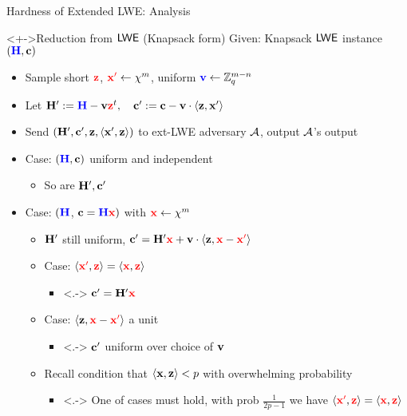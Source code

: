 \begin{frame}{Hardness of Extended LWE: Analysis}
\begin{block}<+->{Reduction from $\textsf{LWE}$ (Knapsack form)}
   Given: Knapsack $\textsf{LWE}$ instance  {\centering
      $({\color{blue} \mathbf{H}},\mathbf{c})$} 
    \begin{itemize}
      \item Sample short ${\color{red} \mathbf{z}}$, ${\color{red} \mathbf{x}'} \gets \chi^m$, uniform ${\color{blue} \mathbf{v}} \gets \mathbb{Z}_q^{m-n}$
      \item Let $\mathbf{H}' := {\color{blue} \mathbf{H}} - \mathbf{v}{\color{red} \mathbf{z}}^t,\quad \mathbf{c}' := \mathbf{c} - \mathbf{v} \cdot \langle{\ensuremath{\mathbf{z}}, \ensuremath{\mathbf{x}}'}\rangle$
      \item Send $(\mathbf{H}', \mathbf{c}', \mathbf{z}, \langle{\ensuremath{\mathbf{x}}',\ensuremath{\mathbf{z}}}\rangle)$ to ext-LWE adversary $\mathcal{A}$, output $\mathcal{A}$'s output
    \end{itemize}
\end{block}
  \begin{itemize}
  \item<+-> \textsf{Case:} $({\color{blue} \mathbf{H}}, \mathbf{c})$ uniform and independent
    \begin{itemize}
      \item<+-> So are $\mathbf{H}', \mathbf{c}'$
\end{itemize}
   \item<+-> Case: $({\color{blue} \mathbf{H}}$, $\mathbf{c}={\color{blue} \mathbf{H}}{\color{red} \mathbf{x}})$ with ${\color{red} \mathbf{x}} \gets \chi^{m}$
\begin{itemize}
\item<+-> $\mathbf{H}'$ still uniform, $\mathbf{c}' = \mathbf{H}'{\color{red} \mathbf{x}} + \mathbf{v} \cdot \langle{\ensuremath{\mathbf{z}},\ensuremath{{\color{red} \mathbf{x}}}-\ensuremath{{\color{red} \mathbf{x}'}}}\rangle$
\item<+-> Case: $\langle{\ensuremath{{\color{red} \mathbf{x}'}},\ensuremath{{\color{red} \mathbf{z}}}}\rangle=\langle{\ensuremath{{\color{red} \mathbf{x}}},\ensuremath{{\color{red} \mathbf{z}}}}\rangle$
\begin{itemize}
\item<.-> $\mathbf{c}'=\mathbf{H}'{\color{red} \mathbf{x}}$
\end{itemize}
\item<+-> Case: $\langle{\ensuremath{\mathbf{z}},\ensuremath{{\color{red} \mathbf{x}}}-\ensuremath{{\color{red} \mathbf{x}'}}}\rangle$ a unit
\begin{itemize}
\item<.-> $\mathbf{c}'$ uniform over choice of $\mathbf{v}$
\end{itemize}
\item<+-> Recall condition that $\langle{\ensuremath{\mathbf{x}},\ensuremath{\mathbf{z}}}\rangle < p$ with overwhelming probability
\begin{itemize}
\item<.-> One of cases must hold, with prob $\frac{1}{2p-1}$ we have $\langle{\ensuremath{{\color{red} \mathbf{x}'}},\ensuremath{{\color{red} \mathbf{z}}}}\rangle=\langle{\ensuremath{{\color{red} \mathbf{x}}},\ensuremath{{\color{red} \mathbf{z}}}}\rangle$
\end{itemize}
  
\end{itemize}



  \end{itemize}
\end{frame}

